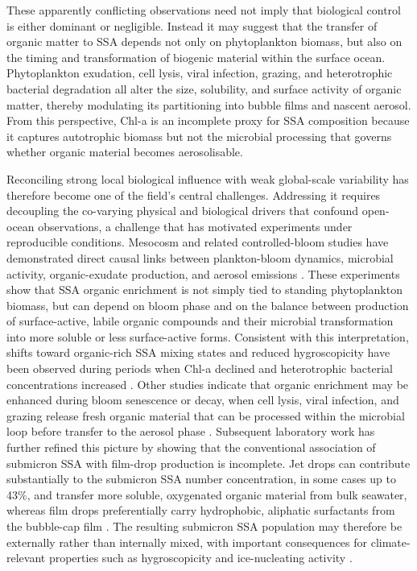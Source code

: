 \documentclass[ProofPDF]{./Styles/Jnls-Template-V3}
\begin{document}
These apparently conflicting observations need not imply that biological control is either dominant or negligible. Instead it may suggest that the transfer of organic matter to SSA depends not only on phytoplankton biomass, but also on the timing and transformation of biogenic material within the surface ocean. Phytoplankton exudation, cell lysis, viral infection, grazing, and heterotrophic bacterial degradation all alter the size, solubility, and surface activity of organic matter, thereby modulating its partitioning into bubble films and nascent aerosol. From this perspective, Chl-a is an incomplete proxy for SSA composition because it captures autotrophic biomass but not the microbial processing that governs whether organic material becomes aerosolisable.

Reconciling strong local biological influence with weak global-scale variability has therefore become one of the field’s central challenges. Addressing it requires decoupling the co-varying physical and biological drivers that confound open-ocean observations, a challenge that has motivated experiments under reproducible conditions. Mesocosm and related controlled-bloom studies have demonstrated direct causal links between plankton-bloom dynamics, microbial activity, organic-exudate production, and aerosol emissions \citep[e.g.,][]{Prather2013,Lee2015,Wang2015}. These experiments show that SSA organic enrichment is not simply tied to standing phytoplankton biomass, but can depend on bloom phase and on the balance between production of surface-active, labile organic compounds and their microbial transformation into more soluble or less surface-active forms. Consistent with this interpretation, shifts toward organic-rich SSA mixing states and reduced hygroscopicity have been observed during periods when Chl-a declined and heterotrophic bacterial concentrations increased \citep{Prather2013}. Other studies indicate that organic enrichment may be enhanced during bloom senescence or decay, when cell lysis, viral infection, and grazing release fresh organic material that can be processed within the microbial loop before transfer to the aerosol phase \citep{odowd2015,Miyazaki2020}. Subsequent laboratory work has further refined this picture by showing that the conventional association of submicron SSA with film-drop production is incomplete. Jet drops can contribute substantially to the submicron SSA number concentration, in some cases up to 43\%, and transfer more soluble, oxygenated organic material from bulk seawater, whereas film drops preferentially carry hydrophobic, aliphatic surfactants from the bubble-cap film \citep{Wang2017}. The resulting submicron SSA population may therefore be externally rather than internally mixed, with important consequences for climate-relevant properties such as hygroscopicity and ice-nucleating activity \citep[e.g.,][]{Wex2010,Collins2013,Wang2017}.
\end{document}
